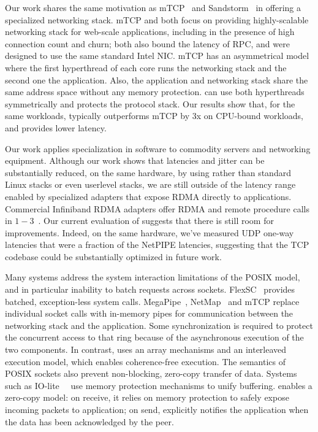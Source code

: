  Our work shares the same
motivation as mTCP~\cite{jeong2014mtcp} and
Sandstorm~\cite{marinos2013network} in offering a specialized
networking stack.  mTCP and \ix both focus on
providing highly-scalable
networking stack for web-scale applications, including in the presence
of high connection count and churn; both also bound the
latency of RPC, and were designed to use the same standard Intel NIC.
mTCP has an asymmetrical model where the first hyperthread of each
core runs the networking stack and the second one the application.
Also, the application and networking stack share the same address
space without any memory protection.  \ix can use both hyperthreads symmetrically
and protects the protocol stack.   Our results show
that, for the same workloads, \ix typically outperforms mTCP by 3x on
CPU-bound workloads, and provides lower latency.
 

 Our work applies
specialization in software to commodity servers and networking
equipment.  Although our work shows that latencies and jitter can be
substantially reduced, on the same hardware, by using \ix rather than
standard Linux stacks or even userlevel stacks, we are still outside
of the latency range enabled by specialized adapters that expose RDMA
directly to applications.  Commercial Infiniband RDMA adapters offer
RDMA and remote procedure calls in
$1-3$\microsecond~\cite{DBLP:conf/sosp/OngaroRSOR11,Jose:2011:MDH,mitchell:rdma,dragojevic14farm}.
Our current evaluation of \ix suggests that there is still room for
improvements.  Indeed, on the same hardware, we've measured UDP
one-way latencies that were a fraction of the NetPIPE latencies,
suggesting that the TCP codebase could be substantially optimized in
future work. 

 Many systems
address the system interaction limitations of the POSIX model, and in
particular inability to batch requests across sockets.
FlexSC~\cite{soares2010flexsc} provides batched, exception-less system
calls.  MegaPipe~\cite{han2012megapipe}, NetMap~\cite{rizzo2012netmap}
and mTCP replace individual socket calls with in-memory pipes for
communication between the networking stack and the application.  Some
synchronization is required to protect the concurrent access to that
ring because of the asynchronous execution of the two components.  In
contrast, \ix uses an array mechanisms and an interleaved execution
model, which enables coherence-free execution.  The semantics of POSIX
sockets also prevent non-blocking, zero-copy transfer of data. Systems
such as IO-lite~~\cite{DBLP:journals/tocs/PaiDZ00} use memory
protection mechanisms to unify buffering.  \ix enables a zero-copy
model: on receive, it relies on memory protection to safely expose
incoming packets to application; on send, \ix explicitly notifies the
application when the data has been acknowledged by the peer.



